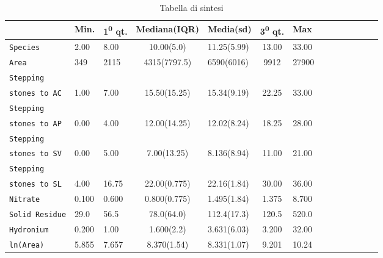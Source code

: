 \documentclass{article} %
\begin{document}
\begin{table}[H]
    \centering
    \renewcommand{\arraystretch}{1.4} %
    \begin{tabularx}{\textwidth}{p{69pt}l p{30pt}c p{45pt}c p{35pt}c p{40pt}c p{30pt}c p{27pt}r}
        \toprule
        & Min. & 1\textsuperscript{0} qt. & Mediana(IQR) & Media(sd) & 3\textsuperscript{0} qt. & Max\\
            \midrule  
            \texttt{Species} & 2.00 & 8.00 & 10.00(5.0) & 11.25(5.99) & 13.00 & 33.00 \\
            \texttt{Area} & 349 & 2115 & 4315(7797.5) & 6590(6016) & 9912 & 27900 \\
            \texttt{Stepping}\\ \texttt{stones to AC} & 1.00 & 7.00 & 15.50(15.25) & 15.34(9.19) & 22.25 & 33.00 \\
            \texttt{Stepping }\\
            \texttt{stones to AP} & 0.00 & 4.00 & 12.00(14.25) & 12.02(8.24) & 18.25 & 28.00 \\
            \texttt{Stepping }\\
            \texttt{stones to SV} & 0.00 & 5.00 & 7.00(13.25) & 8.136(8.94) & 11.00 & 21.00 \\
            \texttt{Stepping }\\
            \texttt{stones to SL} & 4.00 & 16.75 & 22.00(0.775) & 22.16(1.84) & 30.00 & 36.00 \\
            \texttt{Nitrate} & 0.100 & 0.600 & 0.800(0.775) & 1.495(1.84) & 1.375 & 8.700 \\
            \texttt{Solid Residue} & 29.0 & 56.5 & 78.0(64.0) & 112.4(17.3) & 120.5 & 520.0 \\
            \texttt{Hydronium} & 0.200 & 1.00 & 1.600(2.2) & 3.631(6.03) & 3.200 & 32.00 \\
            \texttt{ln(Area)} & 5.855 & 7.657 & 8.370(1.54) & 8.331(1.07) & 9.201 & 10.24 \\
        \bottomrule
    \end{tabularx}
    \caption{Tabella di sintesi}
\end{table}


\end{document}
